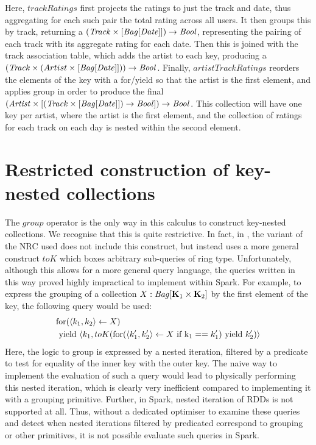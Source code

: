 {{{{Here, $trackRatings$ first projects the ratings to just the track and date, thus aggregating for each such pair the total rating across all users. It then groups this by track, returning a $(\textrm{\textit{Track}} \times [\textrm{\textit{Bag}}[\textrm{\textit{Date}}]]) \rightarrow \textrm{\textit{Bool}}$, representing the pairing of each track with its aggregate rating for each date. Then this is joined with the track association table, which adds the artist to each key, producing a $(\textrm{\textit{Track}} \times (Artist \times [\textrm{\textit{Bag}}[\textrm{\textit{Date}}]])) \rightarrow \textrm{\textit{Bool}}$. Finally, $artistTrackRatings$ reorders the elements of the key with a for/yield so that the artist is the first element, and applies group in order to produce the final
$(\textrm{\textit{Artist}} \times [(\textrm{\textit{Track}} \times [\textrm{\textit{Bag}}[\textrm{\textit{Date}}]]) \rightarrow \textrm{\textit{Bool}}]) \rightarrow \textrm{\textit{Bool}}$. This collection will have one key per artist, where the artist is the first element, and the collection of ratings for each track on each day is nested within the second element.
}

\section{Restricted construction of key-nested collections}
The $group$ operator is the only way in this calculus to construct key-nested collections. We recognise that this is quite restrictive. In fact, in \cite{draftpaper}, the variant of the NRC used does not include this construct, but instead uses a more general construct $toK$ which boxes arbitrary sub-queries of ring type. Unfortunately, although this allows for a more general query language, the queries written in this way proved highly impractical to implement within Spark. For example, to express the grouping of a collection $X: \textrm{\textit{Bag}}[\mathbf{K}_1 \times \mathbf{K}_2]$ by the first element of the key, the following query would be used:
\begin{equation*}
\begin{split}
&\textrm{for}(\langle k_1, k_2 \rangle \leftarrow X) \\
&\textrm{ yield } \langle k_1, toK(\textrm{for}(\langle k_1', k_2' \rangle \leftarrow X \textrm{ if k}_1 == k_1') \textrm{ yield } k_2') \rangle
\end{split}
\end{equation*}
Here, the logic to group is expressed by a nested iteration, filtered by a predicate to test for equality of the inner key with the outer key.
The naive way to implement the evaluation of such a query would lead to physically performing this nested iteration, which is clearly very inefficient compared to implementing it with a grouping primitive. Further, in Spark, nested iteration of RDDs is not supported at all.
Thus, without a dedicated optimiser to examine these queries and detect when nested iterations filtered by predicated correspond to grouping or other primitives, it is not possible evaluate such queries in Spark.

}}}
